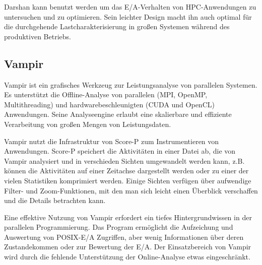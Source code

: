 Darshan kann benutzt werden um das E/A-Verhalten von HPC-Anwendungen zu untersuchen und zu optimieren. 
Sein leichter Design macht ihn auch optimal für die durchgehende Lastcharakterisierung in großen Systemen während des produktiven Betriebs.


\subsection{Vampir}
Vampir  ist ein grafisches Werkzeug zur Leistungsanalyse von parallelen Systemen. 
Es unterstützt die Offline-Analyse von parallelen (MPI, OpenMP, Multithreading) und hardwarebeschleunigten (CUDA und OpenCL) Anwendungen. 
Seine Analyseengine erlaubt eine skalierbare und effiziente Verarbeitung von großen Mengen von Leistungsdaten.

Vampir nutzt die Infrastruktur von Score-P  zum Instrumentieren von Anwendungen. 
Score-P speichert die Aktivitäten in einer Datei ab, die von Vampir analysiert und in verschieden Sichten umgewandelt werden kann, z.B. können die Aktivitäten auf einer Zeitachse dargestellt werden oder zu einer der vielen Statistiken komprimiert werden. 
Einige Sichten verfügen über aufwendige Filter- und Zoom-Funktionen, mit den man sich leicht einen Überblick verschaffen und die Details betrachten kann.  

Eine effektive Nutzung von Vampir erfordert ein tiefes Hintergrundwissen in der parallelen Programmierung. 
Das Program ermöglicht die Aufzeichung und Auswertung von POSIX-E/A Zugriffen, aber wenig Informationen über deren Zustandekommen oder zur Bewertung der E/A. 
Der Einsatzbereich von Vampir wird durch die fehlende Unterstützung der Online-Analyse etwas eingeschränkt.  



